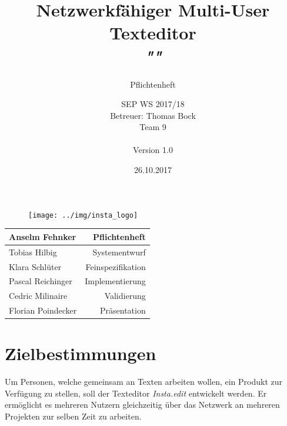 \documentclass{scrartcl}
\title{Netzwerkfähiger Multi-User Texteditor\\
\textit{"\name"}}
\subtitle{Pflichtenheft}
\author{SEP WS 2017/18\\
Betreuer: Thomas Bock\\
Team 9\\ \\
Version 1.0}
\date{26.10.2017}
\newcommand{\name}{Insta.edit}
\begin{document}
\maketitle

\begin{figure}[h]
	\centering
  \texttt{[image: ../img/insta\_logo]}
	\label{fig:logo}
\end{figure}

\vfill

\begin{center}
  \begin{tabular}{ | l | r | }
    \hline
    Anselm Fehnker & Pflichtenheft \\ \hline
    Tobias Hilbig & Systementwurf \\ \hline
    Klara Schlüter & Feinspezifikation \\ \hline
    Pascal Reichinger & Implementierung \\ \hline
    Cedric Milinaire & Validierung \\ \hline
    Florian Poindecker & Präsentation  \\ \hline
  \end{tabular}
\end{center}

\thispagestyle{empty}
\pagebreak
\renewcommand{\contentsname}{Inhaltsverzeichnis}
\tableofcontents
\newpage

\section{Zielbestimmungen}
\label{zielbestimmungen}

Um Personen, welche gemeinsam an Texten arbeiten wollen, ein Produkt zur Verfügung zu stellen, soll der Texteditor \textit{\name} entwickelt werden. Er ermöglicht es mehreren Nutzern gleichzeitig über das Netzwerk an mehreren Projekten zur selben Zeit zu arbeiten.
\end{document}
